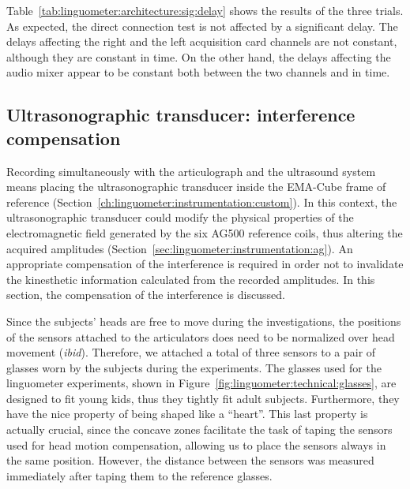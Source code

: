 Table~\ref{tab:linguometer:architecture:sig:delay} shows the results of the
three trials. As expected, the direct connection test is not affected by a
significant delay. The delays affecting the right and the left acquisition card
channels are not constant, although they are constant in time. 
On the other hand, the delays affecting the audio mixer appear to be constant
both between the two channels and in time.
\subsection{Ultrasonographic transducer: interference compensation}
\label{sec:linguometer:technical:interference}
Recording simultaneously with the
articulograph and the ultrasound system means placing the ultrasonographic 
transducer inside the EMA-Cube frame of reference
(Section~\ref{ch:linguometer:instrumentation:custom}).
In this context, the ultrasonographic transducer could  
modify the physical properties of the electromagnetic field generated by the six
AG500 reference coils, thus altering the acquired amplitudes
(Section~\ref{sec:linguometer:instrumentation:ag}).
An appropriate compensation of the interference is required in order not to
invalidate the kinesthetic information calculated from the recorded amplitudes.
In this section, the compensation of the interference is discussed.

Since the subjects' heads
are free to move during the investigations, the positions
of the sensors attached to the articulators does need to be normalized over head
movement (\emph{ibid}).
Therefore, we attached a total of three sensors to a pair of 
glasses worn by the subjects during the experiments.
The glasses used for the linguometer experiments, shown in 
Figure~\ref{fig:linguometer:technical:glasses}, are designed to
fit young kids, thus they tightly fit adult subjects.
Furthermore, they have the nice property of being shaped like a ``heart''.
This last property is actually crucial, since the concave
zones facilitate the task of taping the sensors used for head motion
compensation, allowing us to place the sensors always in the same
position.
However, the distance between the sensors was measured immediately after taping
them to the reference glasses.

